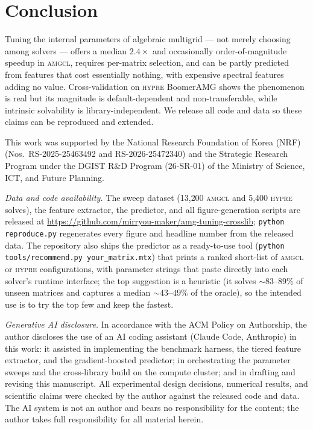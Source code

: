 \documentclass[acmsmall,screen,review]{acmart}
\newcommand{\amgcl}{\textsc{amgcl}}
\newcommand{\hypre}{\textsc{hypre}}
\begin{document}
\section{Conclusion}
\label{sec:conclusion}

Tuning the internal parameters of algebraic multigrid --- not merely choosing
among solvers --- offers a median $2.4\times$ and occasionally
order-of-magnitude speedup in \amgcl{}, requires per-matrix selection, and can
be partly predicted from features that cost essentially nothing, with expensive
spectral features adding no value. Cross-validation on \hypre{} BoomerAMG shows
the phenomenon is real but its magnitude is default-dependent and
non-transferable, while intrinsic solvability is library-independent. We
release all code and data so these claims can be reproduced and extended.

\begin{acks}
This work was supported by the National Research Foundation of Korea (NRF)
(Nos.\ RS-2025-25463492 and RS-2026-25472340) and the Strategic Research
Program under the DGIST R\&D
Program (26-SR-01) of the Ministry of Science, ICT, and Future Planning.

\emph{Data and code availability.} The sweep dataset (13{,}200 \amgcl{} and
5{,}400 \hypre{} solves), the feature extractor, the predictor, and all
figure-generation scripts are released at
\url{https://github.com/mirryou-maker/amg-tuning-crosslib}; \texttt{python
reproduce.py} regenerates every figure and headline number from the released
data. The repository also ships the predictor as a ready-to-use tool
(\texttt{python tools/recommend.py your\_matrix.mtx}) that prints a ranked
short-list of \amgcl{} or \hypre{} configurations, with parameter strings that
paste directly into each solver's runtime interface; the top suggestion is a
heuristic (it solves $\sim\!83$--$89\%$ of unseen matrices and captures a
median $\sim\!43$--$49\%$ of the oracle), so the intended use is to try the top
few and keep the fastest.

\emph{Generative AI disclosure.} In accordance with the ACM Policy on
Authorship, the author discloses the use of an AI coding assistant (Claude
Code, Anthropic) in this work: it assisted in implementing the benchmark
harness, the tiered feature extractor, and the gradient-boosted predictor; in
orchestrating the parameter sweeps and the cross-library build on the compute
cluster; and in drafting and revising this manuscript. All experimental design
decisions, numerical results, and scientific claims were checked by the author
against the released code and data. The AI system is not an author and bears no
responsibility for the content; the author takes full responsibility for all
material herein.
\end{acks}
\end{document}
